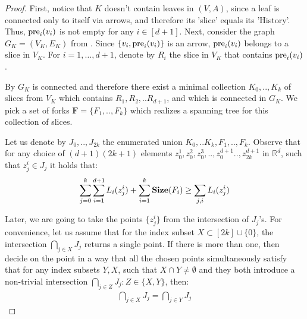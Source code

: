   \begin{proof}
First, notice that $K$ doesn't contain leaves in $(V,A)$, since a leaf is connected only to itself via arrows, and therefore its 'slice' equals its 'History'. Thus, $\text{pre}_{i}(v_{i})$ is not empty for any $i \in [d+1]$. Next, consider the graph $G_{K} = (V_{K},E_{K})$ from . Since $\{ v_{i}, \text{pre}_{i}(v_{i}) \}$ is an arrow, $\text{pre}_{i}(v_{i})$ belongs to a slice in $V_{K}$. For $i=1,\ldots,d+1$, denote by $R_{i}$ the slice in $V_{K}$ that contains $\text{pre}_{i}(v_i)$.

    By  $G_{K}$ is connected and therefore there exist a minimal collection $K_{0},..,K_{k}$ of slices from $V_{K}$ which contains $R_{1},R_{2},..R_{d+1}$, and which is connected in $G_{K}$. We pick a set of forks $\mathbf{F} = \{F_{1},..,F_{k} \}$ which realizes a spanning tree for this collection of slices. %


   
    Let us denote by $J_{0},..,J_{2k}$ the enumerated union $K_{0},..K_{k},F_{1},..,F_{k}$. Observe that for any choice of $(d+1)(2k+1)$ elements $z_{0}^{1},z_{0}^{2}, z_{0}^{3},..,z_{0}^{d+1}..,z_{2k}^{d+1}$ in $\mathbb{R}^{d}$, such that $z_{j}^{i} \in J_{j}$ it holds that:
    \begin{equation}
      \label{equ:spanlow}
      \begin{split}
         \sum_{j=0}^{k}\sum_{i=1}^{d+1}L_{i}(z_{j}^{i}) + \sum^{k}_{i=1}\mathbf{Size}(F_{i})  \ge \sum_{j,i}L_{i}(z_{j}^{i})
      \end{split}
    \end{equation}

Later, we are going to take the points $\{z_{j}^{i}\}$ from the intersection of $J_{j}$'s. For convenience, let us assume that for the index subset $X \subset [2k]\cup\{0\}$, the intersection $\bigcap_{j \in X}J_{j}$ returns a single point. If there is more than one, then decide on the point in a way that all the chosen points simultaneously satisfy that for any index subsets $Y, X$, such that $X \cap Y \neq \emptyset$ and they both introduce a non-trivial intersection $\bigcap_{j \in Z} J_{j} : Z\in \{X,Y\}$, then:
    \begin{equation*}
      \begin{split}
        \bigcap_{j \in X} J_{j} = \bigcap_{j \in Y } J_{j} 
      \end{split}
    \end{equation*}


\end{proof}
